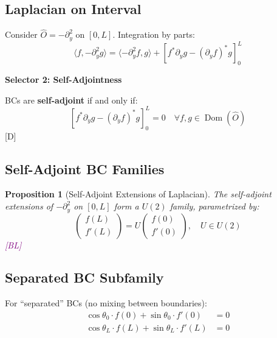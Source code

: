 \documentclass[11pt,a4paper]{article}
\newtheorem{proposition}[theorem]{Proposition}
\newcommand{\tagD}{\textcolor{blue!70!black}{[D]}}
\newcommand{\tagBL}{\textcolor{purple}{[BL]}}
\DeclareMathOperator{\Dom}{Dom}
\begin{document}
\subsection{Laplacian on Interval}

Consider $\hat{O} = -\partial_y^2$ on $[0, L]$. Integration by parts:
\begin{equation}
\label{eq:laplacian-ibp}
\langle f, -\partial_y^2 g \rangle = \langle -\partial_y^2 f, g \rangle
+ \left[ f^* \partial_y g - (\partial_y f)^* g \right]_0^L
\end{equation}

\begin{selectorbox}
\textbf{Selector 2: Self-Adjointness}

BCs are \textbf{self-adjoint} if and only if:
\begin{equation}
\label{eq:sa-selector}
\boxed{\left[ f^* \partial_y g - (\partial_y f)^* g \right]_0^L = 0 \quad \forall f, g \in \Dom(\hat{O})}
\end{equation}
\tagD
\end{selectorbox}

\subsection{Self-Adjoint BC Families}

\begin{proposition}[Self-Adjoint Extensions of Laplacian]
\label{prop:sa-extensions}
The self-adjoint extensions of $-\partial_y^2$ on $[0, L]$ form a $U(2)$ family,
parametrized by:
\begin{equation}
\label{eq:sa-family}
\begin{pmatrix} f(L) \\ f'(L) \end{pmatrix} = U \begin{pmatrix} f(0) \\ f'(0) \end{pmatrix}, \quad U \in U(2)
\end{equation}
\tagBL
\end{proposition}

\subsection{Separated BC Subfamily}

For ``separated'' BCs (no mixing between boundaries):
\begin{align}
\label{eq:sep-0}
\cos\theta_0 \cdot f(0) + \sin\theta_0 \cdot f'(0) &= 0 \\
\label{eq:sep-L}
\cos\theta_L \cdot f(L) + \sin\theta_L \cdot f'(L) &= 0
\end{align}
\end{document}
